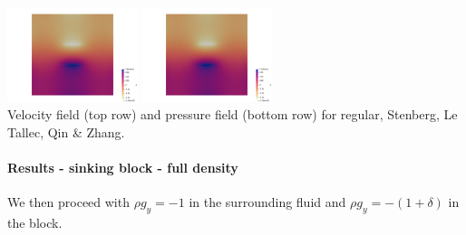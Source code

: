\begin{center}
\includegraphics[width=3.8cm]{python_codes/fieldstone_78/results/block/reduced/p2}
\includegraphics[width=3.8cm]{python_codes/fieldstone_78/results/block/reduced/p3}\\
{\captionfont Velocity field (top row) and pressure field (bottom row) 
for regular, Stenberg, Le Tallec, Qin \& Zhang.} 
\end{center}


\paragraph{Results - sinking block - full density}

We then proceed with $\rho g_y=-1$ in the surrounding fluid and $\rho g_y=-(1+\delta)$ in the block.

